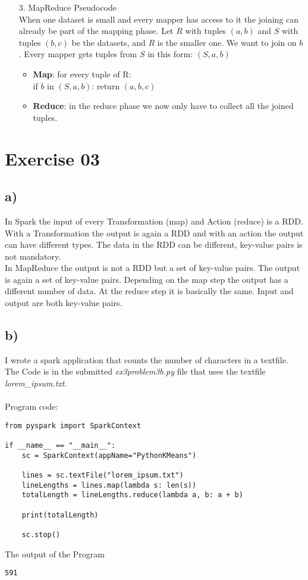 \documentclass[11pt,a4paper]{scrartcl}
\begin{document}
\begin{itemize}
		\item[3.] MapReduce Pseudocode \\
		When one dataset is small and every mapper has access to it the joining can already be part of the mapping phase. Let $R$ with tuples $(a,b)$ and $S$ with tuples $(b,c)$ be the datasets, and $R$ is the smaller one. We want to join on $b$. Every mapper gets tuples from $S$ in this form: $(S,a,b)$
		\begin{itemize}
			\item \textbf{Map}: for every tuple of R: \\
			if $b$ in $(S,a,b)$: return $(a,b,c)$
			\item \textbf{Reduce}: in the reduce phase we now only have to collect all the joined tuples. 
		\end{itemize}



	\end{itemize}
	
	
\section*{Exercise 03}

\subsection*{a)}

In Spark the input of every Transformation (map) and Action (reduce) is a RDD. With a Transformation the output is again a RDD and with an action the output can have different types. The data in the RDD can be different, key-value pairs is not mandatory.\\
In MapReduce the output is not a RDD but a set of key-value pairs. The output is again a set of key-value pairs. Depending on the map step the output has a different number of data. At the reduce step it is basically the same. Input and output are both key-value pairs. 

\subsection*{b)}

I wrote a spark application that counts the number of characters in a textfile. The Code is in the submitted \textit{ex3problem3b.py} file that uses the textfile \textit{lorem\_ipsum.txt}.\\\\
Program code:
\lstset{breaklines=true}
\begin{lstlisting}
from pyspark import SparkContext

if __name__ == "__main__":
    sc = SparkContext(appName="PythonKMeans")

    lines = sc.textFile("lorem_ipsum.txt")
    lineLengths = lines.map(lambda s: len(s))
    totalLength = lineLengths.reduce(lambda a, b: a + b)

    print(totalLength)

    sc.stop()
\end{lstlisting}

The output of the Program

\begin{lstlisting}
591
\end{lstlisting}
\end{document}
